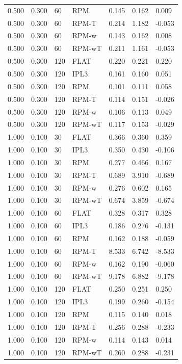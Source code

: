 \begin{tabular}{lllllll}
0.500 & 0.300 & 60 & RPM & 0.145 & 0.162 & 0.009 \\
0.500 & 0.300 & 60 & RPM-T & 0.214 & 1.182 & -0.053 \\
0.500 & 0.300 & 60 & RPM-w & 0.143 & 0.162 & 0.008 \\
0.500 & 0.300 & 60 & RPM-wT & 0.211 & 1.161 & -0.053 \\
0.500 & 0.300 & 120 & FLAT & 0.220 & 0.221 & 0.220 \\
0.500 & 0.300 & 120 & IPL3 & 0.161 & 0.160 & 0.051 \\
0.500 & 0.300 & 120 & RPM & 0.101 & 0.111 & 0.058 \\
0.500 & 0.300 & 120 & RPM-T & 0.114 & 0.151 & -0.026 \\
0.500 & 0.300 & 120 & RPM-w & 0.106 & 0.113 & 0.049 \\
0.500 & 0.300 & 120 & RPM-wT & 0.117 & 0.153 & -0.029 \\
1.000 & 0.100 & 30 & FLAT & 0.366 & 0.360 & 0.359 \\
1.000 & 0.100 & 30 & IPL3 & 0.350 & 0.430 & -0.106 \\
1.000 & 0.100 & 30 & RPM & 0.277 & 0.466 & 0.167 \\
1.000 & 0.100 & 30 & RPM-T & 0.689 & 3.910 & -0.689 \\
1.000 & 0.100 & 30 & RPM-w & 0.276 & 0.602 & 0.165 \\
1.000 & 0.100 & 30 & RPM-wT & 0.674 & 3.859 & -0.674 \\
1.000 & 0.100 & 60 & FLAT & 0.328 & 0.317 & 0.328 \\
1.000 & 0.100 & 60 & IPL3 & 0.186 & 0.276 & -0.131 \\
1.000 & 0.100 & 60 & RPM & 0.162 & 0.188 & -0.059 \\
1.000 & 0.100 & 60 & RPM-T & 8.533 & 6.742 & -8.533 \\
1.000 & 0.100 & 60 & RPM-w & 0.162 & 0.190 & -0.060 \\
1.000 & 0.100 & 60 & RPM-wT & 9.178 & 6.882 & -9.178 \\
1.000 & 0.100 & 120 & FLAT & 0.250 & 0.251 & 0.250 \\
1.000 & 0.100 & 120 & IPL3 & 0.199 & 0.260 & -0.154 \\
1.000 & 0.100 & 120 & RPM & 0.115 & 0.140 & 0.018 \\
1.000 & 0.100 & 120 & RPM-T & 0.256 & 0.288 & -0.233 \\
1.000 & 0.100 & 120 & RPM-w & 0.114 & 0.143 & 0.014 \\
1.000 & 0.100 & 120 & RPM-wT & 0.260 & 0.288 & -0.231 \\

\end{tabular}
